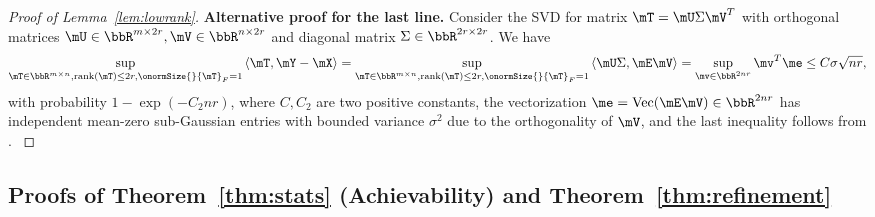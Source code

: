 \documentclass[lettersize,onecolumn,journal]{IEEEtran}
\theoremstyle{definition}
\theoremstyle{definition}
\newcommand{\ang}[1]{\left\langle#1\right\rangle}
\begin{document}
{\begin{proof}[Proof of Lemma~\ref{lem:lowrank}]
        {\color{red} \textbf{Alternative proof for the last line.}
        Consider the SVD for matrix $\mT = \mU \Sigma \mV^T$ with orthogonal matrices $\mU \in \bbR^{m \times 2r}, \mV \in \bbR^{n \times 2r}$ and diagonal matrix $\Sigma \in \bbR^{2r \times 2r}$. We have 
        \begin{align}
            \sup_{\mT \in \bbR^{m \times n}, \text{rank}(\mT) \leq 2r, \onormSize{}{\mT}_F = 1} \ang{\mT, \mY - \mX} = \sup_{\mT \in \bbR^{m \times n}, \text{rank}(\mT) \leq 2r, \onormSize{}{\mT}_F = 1} \ang{\mU \Sigma, \mE \mV} 
            =  \sup_{\mv \in \bbR^{2nr}} \mv^T \me \leq C \sigma \sqrt{nr},
        \end{align}
        with probability $1 - \exp(-C_2 nr)$, where $C, C_2$ are two positive constants, the vectorization $\me = \text{Vec}(\mE \mV) \in \bbR^{2nr}$ has independent mean-zero sub-Gaussian entries with bounded variance $\sigma^2$ due to the orthogonality of $\mV$, and the last inequality follows from \citet[Theorem 1.19]{rigollet2015high}.
        }
\end{proof}
}


\subsection{Proofs of Theorem~\ref{thm:stats} (Achievability) and Theorem~\ref{thm:refinement}}\label{sec:statprove2}
\end{document}
